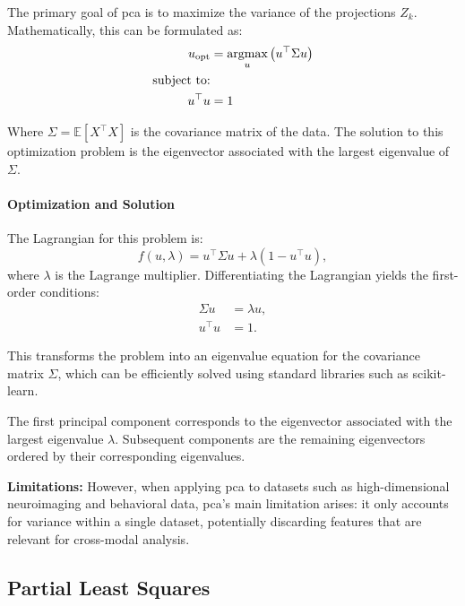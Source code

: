 The primary goal of \acrshort{pca} is to maximize the variance of the projections \(Z_k\). Mathematically, this can be formulated
as:
\begin{align}
    u_{\text{opt}} & = \underset{u}{\text{argmax}} \left( u^\top \Sigma u \right) \\
    \text{subject to:} \notag                                                     \\
    u^\top u       & = 1 \notag
\end{align}

Where \(\Sigma = \mathbb{E}[X^\top X]\) is the covariance matrix of the data. The solution to this optimization problem is the eigenvector associated with the largest eigenvalue of \(\Sigma\).

\paragraph{Optimization and Solution}
The Lagrangian for this problem is:
\begin{equation}
    f(u,\lambda) = u^\top \Sigma u + \lambda(1 - u^\top u),
\end{equation}
where \(\lambda\) is the Lagrange multiplier. Differentiating the Lagrangian yields the first-order conditions:
\begin{align}
    \Sigma u & = \lambda u, \\
    u^\top u & = 1.
\end{align}

This transforms the problem into an eigenvalue equation for the covariance matrix \(\Sigma\), which can be efficiently solved using standard libraries such as scikit-learn\citep{pedregosa2011scikit}.

The first principal component corresponds to the eigenvector associated with the largest eigenvalue \(\lambda\). Subsequent components are the remaining eigenvectors ordered by their corresponding eigenvalues.

\textbf{Limitations: }However, when applying \acrshort{pca} to datasets such as high-dimensional neuroimaging and behavioral
data, \acrshort{pca}'s main limitation arises: it only accounts for variance within a single dataset, potentially discarding features that are relevant for cross-modal analysis.

\subsection{Partial Least Squares}


